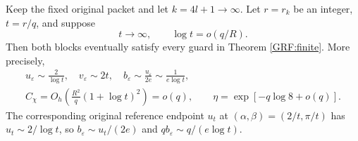 \documentclass[11pt,a4paper]{article}
\begin{document}
\begin{grftheorem}\label{GRF:growing}
Keep the fixed original packet and let $k=4l+1\to\infty$.
Let $r=r_k$ be an integer, $t=r/q$, and suppose
\begin{equation*}\tag{GRF20}\label{GRF:broad}
 t\longrightarrow\infty,\qquad \log t=o(q/R).
\end{equation*}
Then both blocks eventually satisfy every guard in Theorem \ref{GRF:finite}.
More precisely,
\begin{gather*}
 u_\varepsilon\sim\frac2{\log t},\quad
 v_\varepsilon\sim2t,\quad
 b_\varepsilon\sim\frac{u_\varepsilon}{2e}
                   \sim\frac1{e\log t},\tag{GRF21}\label{GRF:cutoffasymptotic}\\
 C_\chi=O_h\left(\frac{R^2}{q}(1+\log t)^2\right)=o(q),\qquad
 \eta=\exp[-q\log8+o(q)].\tag{GRF22}\label{GRF:rates}
\end{gather*}
The corresponding original reference endpoint $u_t$ at
$(\alpha,\beta)=(2/t,\pi/t)$ has $u_t\sim2/\log t$, so
$b_\varepsilon\sim u_t/(2e)$ and $qb_\varepsilon\sim q/(e\log t)$.
\end{grftheorem}
\end{document}

